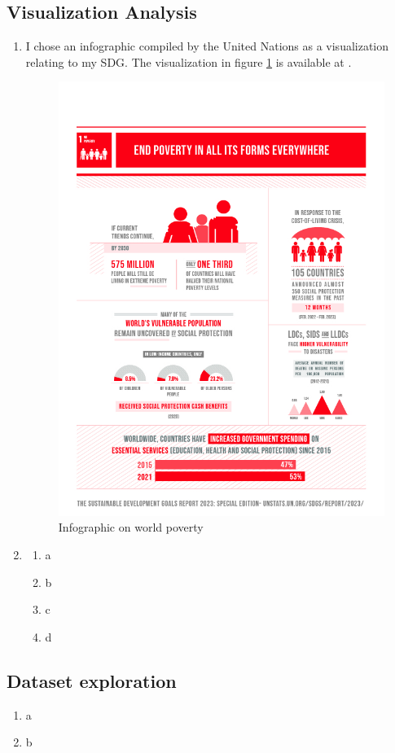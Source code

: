 \documentclass[11pt,a4paper,titlepage]{article}
\begin{document}
\subsection{Visualization Analysis}
\begin{enumerate}
    \item I chose an infographic compiled by the United Nations as a visualization relating to my SDG. The visualization in figure \ref{fig:viz} is available at \cite{vizpov}.
    
    \begin{figure}[h]
        \centering
        \includegraphics[width=0.4\linewidth]{reports/assignment-1/imgs/task2.jpg}
        \caption{Infographic on world poverty}
        \label{fig:viz}
    \end{figure}
    
    \item \begin{enumerate}
        \item a
        \item b
        \item c
        \item d
    \end{enumerate}
    
\end{enumerate}
\subsection{Dataset exploration}
\begin{enumerate}
    \item a
    \item b
\end{enumerate}


\end{document}
